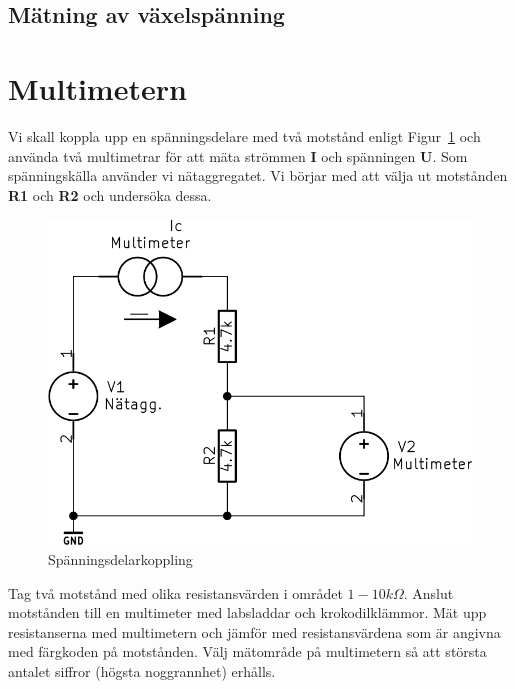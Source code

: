 \documentclass[11pt,a4paper]{article}
\begin{document}
\subsection{Mätning av växelspänning}\label{meas_ac}

\section{Multimetern}\label{}
Vi skall koppla upp en spänningsdelare med två motstånd enligt 
Figur~\ref{fig:2-mm-schem} och använda två multimetrar för att mäta strömmen 
\textbf{I} och spänningen \textbf{U}. Som spänningskälla använder vi 
nätaggregatet. Vi börjar med att välja ut motstånden \textbf{R1} och \textbf{R2}
och undersöka dessa.

\begin{figure}[htbp]
    \centering
        \includegraphics[scale=0.5]{kicad/2-multimeter-schema.png}
    \caption{Spänningsdelarkoppling}
    \label{fig:2-mm-schem}
\end{figure}

Tag två motstånd med olika resistansvärden i området $1-10k\Omega$.
Anslut motstånden till en multimeter med labsladdar och krokodilklämmor.
Mät upp resistanserna med multimetern och jämför med resistansvärdena som är
angivna med färgkoden på motstånden. Välj mätområde på multimetern så att
största antalet siffror (högsta noggrannhet) erhålls.
\end{document}
